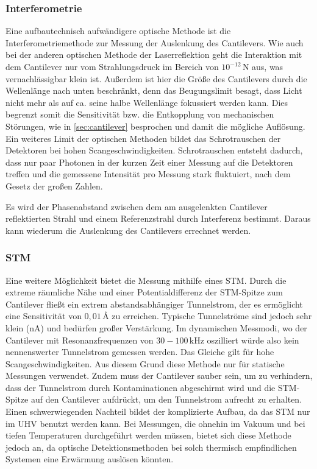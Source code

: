     \subsubsection*{Interferometrie}
        Eine aufbautechnisch aufwändigere optische Methode ist die Interferometriemethode zur Messung der Auslenkung des Cantilevers.
        Wie auch bei der anderen optischen Methode der Laserreflektion geht die Interaktion mit dem Cantilever nur vom Strahlungsdruck im Bereich von $10^{-12}\,$N aus, was vernachlässigbar klein ist.
        Außerdem ist hier die Größe des Cantilevers durch die Wellenlänge nach unten beschränkt, denn das Beugungslimit besagt, dass Licht nicht mehr als auf ca. seine halbe Wellenlänge fokussiert werden kann.
        Dies begrenzt somit die Sensitivität bzw. die Entkopplung von mechanischen Störungen, wie in \autoref{sec:cantilever} besprochen und damit die mögliche Auflösung.
        Ein weiteres Limit der optischen Methoden bildet das Schrotrauschen der Detektoren bei hohen Scangeschwindigkeiten.
        Schrotrauschen entsteht dadurch, dass nur paar Photonen in der kurzen Zeit einer Messung auf die Detektoren treffen und die gemessene Intensität pro Messung stark fluktuiert, nach dem Gesetz der großen Zahlen.

        Es wird der Phasenabstand zwischen dem am ausgelenkten Cantilever reflektierten Strahl und einem Referenzstrahl durch Interferenz bestimmt.
        Daraus kann wiederum die Auslenkung des Cantilevers errechnet werden.

    \subsubsection*{STM}
        Eine weitere Möglichkeit bietet die Messung mithilfe eines STM.
        Durch die extreme räumliche Nähe und einer Potentialdifferenz der STM-Spitze zum Cantilever fließt ein extrem abstandsabhängiger Tunnelstrom, der es ermöglicht eine Sensitivität von $0,01\,\si{\angstrom}$ zu erreichen.
        Typische Tunnelströme sind jedoch sehr klein (nA) und bedürfen großer Verstärkung.
        Im dynamischen Messmodi, wo der Cantilever mit Resonanzfrequenzen von $30-100\,$kHz oszilliert würde also kein nennenswerter Tunnelstrom gemessen werden.
        Das Gleiche gilt für hohe Scangeschwindigkeiten.
        Aus diesem Grund diese Methode nur für statische Messungen verwendet.
        Zudem muss der Cantilever sauber sein, um zu verhindern, dass der Tunnelstrom durch Kontaminationen abgeschirmt wird und die STM-Spitze auf den Cantilever aufdrückt, um den Tunnelstrom aufrecht zu erhalten.
        Einen schwerwiegenden Nachteil bildet der komplizierte Aufbau, da das STM nur im UHV benutzt werden kann.
        Bei Messungen, die ohnehin im Vakuum und bei tiefen Temperaturen durchgeführt werden müssen, bietet sich diese Methode jedoch an, da optische Detektionsmethoden bei solch thermisch empfindlichen Systemen eine Erwärmung auslösen könnten.

